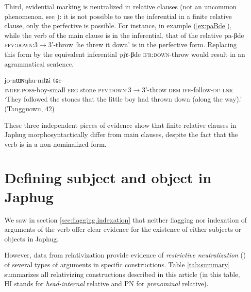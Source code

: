 \documentclass[oldfontcommands,oneside,a4paper,11pt]{article}
\newcommand{\ipa}[1]{{\phon #1}} %
\newcommand{\refb}[1]{(\ref{#1})}
\begin{document}
Third, evidential marking is neutralized in relative clauses (not an uncommon phenomenon, see \citealt[253-6]{aikhenvald06}): it is not possible to use the inferential in a finite relative clause, only the perfective is possible. For instance, in example \refb{ex:paBde}, while the verb of the main clause is in the inferential, that of the relative \ipa{pa-βde} \textsc{pfv:down}:3$\rightarrow$3'-throw `he threw it down' is in the perfective form. Replacing this form  by the equivalent inferential \ipa{pjɤ-βde}  \textsc{ifr:down}-throw would result in an agrammatical sentence.

\begin{exe}
\ex  \label{ex:paBde}
\gll  [\ipa{tɤ-tɕɯ-pɯ} 	\ipa{kɯ} 	\ipa{rdɤstaʁ} 	\ipa{pa-βde}] 	\ipa{nɯ} 	\ipa{jo-nɯɴqhu-ndʑi} \ipa{tɕe} \\
\textsc{indef.poss}-boy-small \textsc{erg} stone \textsc{pfv:down}:3$\rightarrow$3'-throw \textsc{dem} \textsc{ifr}-follow-\textsc{du} \textsc{lnk} \\
\glt `They followed the stones that the little boy had thrown down (along the way).' (Tangguowu, 42)
\end{exe}

These three independent pieces of evidence show that finite relative clauses in Japhug morphosyntactically differ from main clauses, despite the fact that the verb is in a non-nominalized form.

\section{Defining subject and object in Japhug} \label{sec:subject.object}
We saw in section \ref{sec:flagging.indexation} that neither flagging nor indexation of arguments of the verb offer clear evidence for  the existence of either subjects or objects in Japhug.



However, data from relativization provide evidence of \textit{restrictive neutralization} (\citealt[275]{vanvalin97syntax}) of several types of arguments in specific constructions. Table \ref{tab:summary} summarizes all relativizing constructions described in this article (in this table, HI stands for \textit{head-internal} relative and PN for \textit{prenominal} relative).
\end{document}
